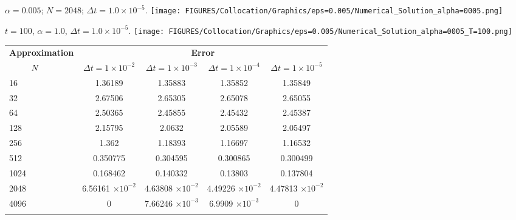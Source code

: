 \begin{frame}
	$\alpha = 0.005$; $N=2048$; $\Delta t = 1.0 \times 10^{-5}$.
	\centering
	\texttt{[image: FIGURES/Collocation/Graphics/eps=0.005/Numerical\_Solution\_alpha=0005.png]}
\end{frame}	
\begin{frame}
	$t = 100$, $\alpha = 1.0$, $\Delta t = 1.0 \times 10^{-5}$.
	\centering
	\texttt{[image: FIGURES/Collocation/Graphics/eps=0.005/Numerical\_Solution\_alpha=0005\_T=100.png]}
\end{frame}

\begin{frame}
\begin{table}
	\begin{tabular}{lcccc}
		\toprule
		\multicolumn{1}{c}{\textbf{Approximation}} & \multicolumn{4}{c}{\textbf{Error}} \\
		$\hspace{9mm}N$ & $\Delta t=1\times 10^{-2}$ & $\Delta t=1\times 10^{-3}$ & $\Delta t=1\times 10^{-4}$ & $\Delta t=1\times 10^{-5}$ \\
		\midrule
		\hspace{7mm} 16 & 1.36189   & 1.35883    & 1.35852   & 1.35849   \\
		\midrule
		\hspace{7mm} 32 & 2.67506   & 2.65305    & 2.65078   & 2.65055   \\
		\midrule
		\hspace{7mm} 64 & 2.50365   & 2.45855    & 2.45432   & 2.45387   \\
		\midrule
		\hspace{7mm} 128 & 2.15795   & 2.0632     & 2.05589   & 2.05497   \\
		\midrule
		\hspace{7mm} 256 & 1.362     & 1.18393    & 1.16697   & 1.16532   \\
		\midrule
		\hspace{7mm} 512 & 0.350775  & 0.304595   & 0.300865  & 0.300499  \\
		\midrule
		\hspace{7mm} 1024 & 0.168462  & 0.140332   & 0.13803   & 0.137804  \\
		\midrule
		\hspace{7mm} 2048 & 6.56161 $\times 10^{-2}$ & 4.63808 $\times 10^{-2}$  & 4.49226 $\times 10^{-2}$ & 4.47813 $\times 10^{-2}$ \\
		\midrule
		\hspace{7mm} 4096 & 0         & 7.66246 $\times 10^{-3}$ & 6.9909 $\times 10^{-3}$ & 0         \\
		\\
		\bottomrule
	\end{tabular}
\end{table}
\end{frame}

